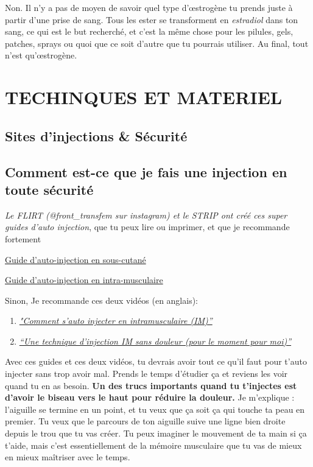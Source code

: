 \documentclass{article}
\begin{document}
Non. Il n'y a pas de moyen de savoir quel type d'œstrogène tu prends juste à partir d'une prise de sang. Tous les ester se transforment en \textit{estradiol} dans ton sang, ce qui est le but recherché, et c'est la même chose pour les pilules, gels, patches, sprays ou quoi que ce soit d'autre que tu pourrais utiliser. Au final, tout n'est qu'œstrogène. 
 

\section{TECHINQUES ET MATERIEL} \label{ts}

\subsection*{Sites d'injections \& Sécurité}

\subsection{Comment est-ce que je fais une injection en toute sécurité}

\textit{Le FLIRT (@front\_transfem sur instagram) et le STRIP ont créé ces super guides d'auto injection}, que tu peux lire ou imprimer, et que je recommande fortement

\href{https://tr.ee/6xXjjsMtPj}{Guide d'auto-injection en sous-cutané}

\href{https://tr.ee/PEeuyOWzvo}{Guide d'auto-injection en intra-musculaire}

Sinon, Je recommande ces deux vidéos (en anglais):

\begin{enumerate}
  \item \href{https://www.youtube.com/watch?v=cBabaGC2Dok}{\textit{"Comment s'auto injecter en intramusculaire (IM)”}}
  \item \href{https://www.youtube.com/watch?v=YfNlAZLxLyw}{\textit{“Une technique d'injection IM sans douleur (pour le moment pour moi)”}}
\end{enumerate}

Avec ces guides et ces deux vidéos, tu devrais avoir tout ce qu'il faut pour t'auto injecter sans trop avoir mal. Prends le temps d'étudier ça et reviens les voir quand tu en as besoin. \textbf{Un des trucs importants quand tu t'injectes est d'avoir le biseau vers le haut pour réduire la douleur.} Je m'explique : l'aiguille se termine en un point, et tu veux que ça soit ça qui touche ta peau en premier. Tu veux que le parcours de ton aiguille suive une ligne bien droite depuis le trou que tu vas créer. Tu peux imaginer le mouvement de ta main si ça t'aide, mais c'est essentiellement de la mémoire musculaire que tu vas de mieux en mieux maîtriser avec le temps.
\end{document}
